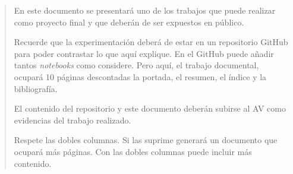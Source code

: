 \renewcommand{\abstractname}{Resumen}

\begin{abstract}    
    En este documento se presentará uno de los trabajos que puede realizar como proyecto final y que deberán de ser expuestos en público.
    
     Recuerde que la experimentación deberá de estar en un repositorio GitHub para poder contrastar lo que aquí explique. En el GitHub puede añadir tantos \textit{notebooks} como considere. Pero aquí, el trabajo documental, ocupará 10 páginas descontadas la portada, el resumen, el índice y la bibliografía.
    
    El contenido del repositorio y este documento deberán subirse al AV como evidencias del trabajo realizado.
    
    Respete las dobles columnas. Si las suprime generará un documento que ocupará más páginas. Con las dobles columnas puede incluir más contenido.
 \end{abstract}